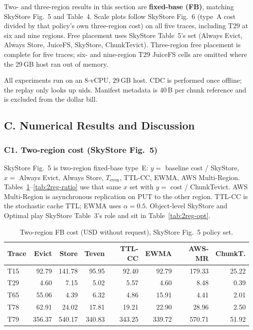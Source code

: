 Two- and three-region results in this section are \textbf{fixed-base ({FB})}, matching SkyStore Fig.~5 and Table~4.
Scale plots follow SkyStore Fig.~6 (type~A cost divided by that policy's own three-region cost) on all five traces, including {T}29 at six and nine regions.
Free placement uses SkyStore Table~5's set (Always Evict, Always Store, JuiceFS, SkyStore, ChunkTevict).
Three-region free placement is complete for five traces; six- and nine-region {T}29 JuiceFS cells are omitted where the 29\,{GB} host ran out of memory.

All experiments run on an 8-v{CPU}, $29$\,{GB} host.
{CDC} is performed once offline; the replay only looks up uids.
Manifest metadata is $40$\,B per chunk reference and is excluded from the dollar bill.

\subsection{C. Numerical Results and Discussion}

\subsubsection{C1. Two-region cost (SkyStore Fig.~5)}
\label{sec:eval-2reg}

SkyStore Fig.~5 is two-region fixed-base type~E: $y=$ baseline cost / SkyStore, $x=$ Always Evict, Always Store, $T_{\mathrm{even}}$, {TTL}-{CC}, {EWMA}, {AWS} Multi-Region.
Tables~\ref{tab:2reg-abs}--\ref{tab:2reg-ratio} use that same $x$ set with $y=$ cost / ChunkTevict.
{AWS} Multi-Region is asynchronous replication on {PUT} to the other region.
{TTL}-{CC} is the stochastic cache {TTL}; {EWMA} uses $\alpha{=}0.5$.
Object-level SkyStore and Optimal play SkyStore Table~3's role and sit in Table~\ref{tab:2reg-opt}.

\begin{table}[t]
\centering
\caption{Two-region {FB} cost (USD without request), SkyStore Fig.~5 policy set.}
\label{tab:2reg-abs}
\setlength{\tabcolsep}{2.4pt}
{\scriptsize
\begin{tabular}{lrrrrrrr}
\toprule
Trace & Evict & Store & Teven & {TTL}-{CC} & {EWMA} & {AWS}-{MR} & ChunkT. \\
\midrule
T15 & 92.79 & 141.78 & 95.95 & 92.40 & 92.79 & 179.33 & 25.22 \\
T29 & 4.60 & 7.15 & 5.02 & 5.57 & 4.60 & 8.48 & 0.39 \\
T65 & 55.06 & 4.39 & 6.32 & 4.86 & 15.91 & 4.41 & 2.01 \\
T78 & 62.91 & 24.02 & 17.81 & 19.21 & 22.90 & 28.96 & 2.50 \\
T79 & 356.37 & 540.17 & 340.83 & 343.25 & 339.72 & 570.71 & 51.92 \\
\bottomrule
\end{tabular}}
\end{table}

